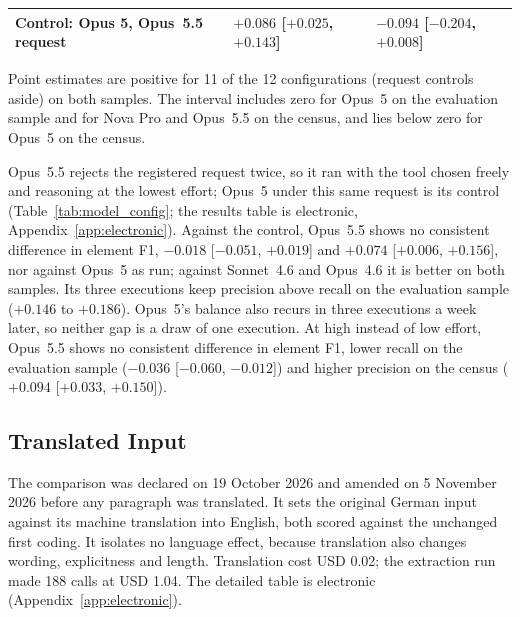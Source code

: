 \begin{table}[htbp]
\begin{threeparttable}
\begin{tabular}{@{}>{\raggedright\arraybackslash}p{50mm}>{\raggedright\arraybackslash}p{42mm}>{\raggedright\arraybackslash}p{42mm}@{}}
Control: Opus 5, Opus~5.5 request & $+0.086$ [$+0.025$, $+0.143$] & $-0.094$ [$-0.204$, $+0.008$] \\
\bottomrule
\end{tabular}
\begin{tablenotes}\footnotesize
\item Point estimates are positive for 11 of the 12 configurations (request controls aside) on both samples. The interval includes zero for Opus~5 on the evaluation sample and for Nova Pro and Opus~5.5 on the census, and lies below zero for Opus~5 on the census.
\end{tablenotes}
\end{threeparttable}
\end{table}

Opus~5.5 rejects the registered request twice, so it ran with the tool chosen freely and reasoning at the lowest effort; Opus~5 under this same request is its control (Table~\ref{tab:model_config}; the results table is electronic, Appendix~\ref{app:electronic}). Against the control, Opus~5.5 shows no consistent difference in element F1, $-0.018$ [$-0.051$, $+0.019$] and $+0.074$ [$+0.006$, $+0.156$], nor against Opus~5 as run; against Sonnet~4.6 and Opus~4.6 it is better on both samples. Its three executions keep precision above recall on the evaluation sample ($+0.146$ to $+0.186$). Opus~5's balance also recurs in three executions a week later, so neither gap is a draw of one execution. At high instead of low effort, Opus~5.5 shows no consistent difference in element F1, lower recall on the evaluation sample ($-0.036$ [$-0.060$, $-0.012$]) and higher precision on the census ($+0.094$ [$+0.033$, $+0.150$]).

\subsection{Translated Input}\label{app:language}\label{subsec:language_results}

The comparison was declared on 19 October 2026 and amended on 5 November 2026 before any paragraph was translated. It sets the original German input against its machine translation into English, both scored against the unchanged first coding. It isolates no language effect, because translation also changes wording, explicitness and length. Translation cost USD 0.02; the extraction run  made 188 calls at USD 1.04. The detailed table is electronic (Appendix~\ref{app:electronic}).


